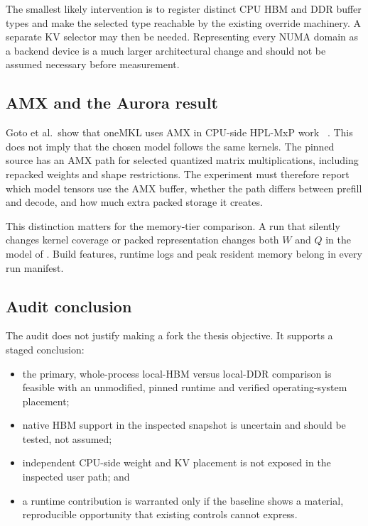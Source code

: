 The smallest likely intervention is to register distinct CPU HBM and
DDR buffer types and make the selected type reachable by the existing
override machinery.  A separate KV selector may then be needed.
Representing every NUMA domain as a backend device is a much larger
architectural change and should not be assumed necessary before
measurement.

\subsection{AMX and the Aurora result}

Goto et al.\ show that oneMKL uses AMX in CPU-side HPL-MxP work
~\cite{goto2026aurorahpl}.  This does not imply that the chosen
\lcpp{} model follows the same kernels.  The pinned source has an AMX
path for selected quantized matrix multiplications, including repacked
weights and shape restrictions.  The experiment must therefore report
which model tensors use the AMX buffer, whether the path differs between
prefill and decode, and how much extra packed storage it creates.

This distinction matters for the memory-tier comparison.  A run that
silently changes kernel coverage or packed representation changes both
\(W\) and \(Q\) in the model of .  Build
features, runtime logs and peak resident memory belong in every run
manifest.

\subsection{Audit conclusion}

The audit does not justify making a \lcpp{} fork the thesis objective.
It supports a staged conclusion:

\begin{itemize}
  \item the primary, whole-process local-HBM versus local-DDR comparison
        is feasible with an unmodified, pinned runtime and verified
        operating-system placement;
  \item native HBM support in the inspected snapshot is uncertain and
        should be tested, not assumed;
  \item independent CPU-side weight and KV placement is not exposed in
        the inspected user path; and
  \item a runtime contribution is warranted only if the baseline shows
        a material, reproducible opportunity that existing controls
        cannot express.
\end{itemize}
